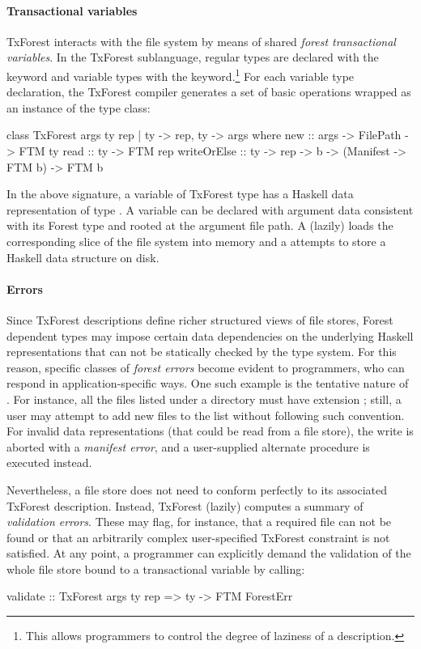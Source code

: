 \paragraph{Transactional variables}
TxForest interacts with the file system by means of shared \emph{forest transactional variables}. In the TxForest sublanguage, regular types are declared with the  keyword and variable types with the  keyword.\footnote{This allows programmers to control the degree of laziness of a description.} For each variable type declaration, the TxForest compiler generates a set of basic operations wrapped as an instance of the  type class:
\begin{code}
class TxForest args ty rep | ty -> rep, ty -> args where
  new         :: args -> FilePath -> FTM ty
  read        :: ty -> FTM rep
  writeOrElse :: ty -> rep -> b
              -> (Manifest -> FTM b) -> FTM b
\end{code}
In the above signature, a variable of TxForest type  has a Haskell data representation of type . A  variable can be declared with argument data consistent with its Forest type and rooted at the argument file path. A  (lazily) loads the corresponding slice of the file system into memory and a  attempts to store a Haskell data structure on disk.

\paragraph{Errors}
Since TxForest descriptions define richer structured views of file stores, Forest dependent types may impose certain data dependencies on the underlying Haskell representations that can not be statically checked by the type system.
For this reason, specific classes of \emph{forest errors} become evident to programmers, who can respond in application-specific ways.
One such example is the tentative nature of . For instance, all the  files listed under a  directory must have extension ; still, a user may attempt to add new files to the  list without following such convention. For invalid data representations (that could be read from a file store), the write is aborted with a \emph{manifest error}, and a user-supplied alternate procedure is executed instead.

Nevertheless, a file store does not need to conform perfectly to its associated TxForest description.
Instead, TxForest (lazily) computes a summary of \emph{validation errors}. These may flag, for instance, that a required file can not be found or that an arbitrarily complex user-specified TxForest constraint is not satisfied.
At any point, a programmer can explicitly demand the validation of the whole file store bound to a transactional variable by calling:
\begin{code}
validate :: TxForest args ty rep => ty -> FTM ForestErr
\end{code}

